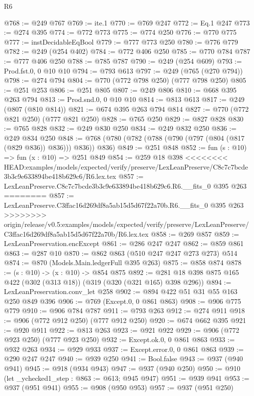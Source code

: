 \begin{lexlean}{R6}
\begin{coremodule}
{{{{{{{{{{{{{{{@768 := @249 @767
@769 := ite.{1}
@770 := @769 @247
@772 := Eq.{1} @247
@773 := @274 @395
@774 := @772 @773
@775 := @774 @250
@776 := @770 @775
@777 := instDecidableEqBool
@779 := @777 @773 @250
@780 := @776 @779
@782 := @249 (@254 @402)
@784 := @772 @406 @250
@785 := @770 @784
@787 := @777 @406 @250
@788 := @785 @787
@790 := @249 (@254 @609)
@793 := Prod.fst.{0, 0} @10 @10
@794 := @793 @613
@797 := @249 (@765 (@270 @794))
@798 := @274 @794
@804 := @770 (@772 @798 @250) (@777 @798 @250)
@805 := @251 @253
@806 := @251 @805
@807 := @249 @806
@810 := @668 @395 @263 @794
@813 := Prod.snd.{0, 0} @10 @10
@814 := @813 @613
@817 := @249 (@807 (@810 @814))
@821 := @674 @395 @263 @794 @814
@827 := @770 (@772 @821 @250) (@777 @821 @250)
@828 := @765 @250
@829 := @827 @828
@830 := @765 @828
@832 := @249 @830 @250
@834 := @249 @832 @250
@836 := @249 @834 @250
@848 := @768 (@780 (@782 (@788 (@790 (@797 (@804 (@817 (@829 @836)) @836))) @836)) @836)
@849 := @251 @848
@852 := fun (s : @10) => fun (x : @10) => @251 @849
@854 := @259 @18 @398
<<<<<<<< HEAD:examples/models/expected/verify/preserve/LexLeanPreserve/C8c7c7bcde3b3c9e633894be418b629c6/R6.lex.tex
@857 := LexLeanPreserve.C8c7c7bcde3b3c9e633894be418b629c6.R6.__fits_0 @395 @263
========
@857 := LexLeanPreserve.C3ffac16d269df8a5ab15d5d67f22a70b.R6.__fits_0 @395 @263
>>>>>>>> origin/release/v0.5:examples/models/expected/verify/preserve/LexLeanPreserve/C3ffac16d269df8a5ab15d5d67f22a70b/R6.lex.tex
@858 := @269 @857
@859 := LexLeanPreservation.encExcept
@861 := @286 @247 @247
@862 := @859 @861
@863 := @287 @10
@870 := @862 @863 (@510 @247 @247 @273 @273) @514
@874 := @870 (Models.Main.ledgerFull @395 @263)
@875 := @858 @874
@878 := (s : @10) -> (x : @10) -> @854 @875
@892 := @281 @18 @398 @875 @165 @422 (@302 (@313 @18)) (@319 (@320 (@321 @165) @398 @296))
@894 := LexLeanPreservation.conv_let @258
@902 := @894 @422 @51 @31 @55 @163 @250 @849 @396
@906 := @769 (Except.{0, 0} @861 @863)
@908 := @906 @775 @779
@910 := @906 @784 @787
@911 := @793 @263
@912 := @274 @911
@918 := @906 (@772 @912 @250) (@777 @912 @250)
@920 := @674 @662 @395
@921 := @920 @911
@922 := @813 @263
@923 := @921 @922
@929 := @906 (@772 @923 @250) (@777 @923 @250)
@932 := Except.ok.{0, 0} @861 @863
@933 := @932 @263
@934 := @929 @933
@937 := Except.error.{0, 0} @861 @863
@939 := @290 @247 @247
@940 := @939 @250
@941 := Bool.false
@943 := @937 (@940 @941)
@945 := @918 (@934 @943)
@947 := @937 (@940 @250)
@950 := @910 (let _ychecked1_step : @863 := @613; @945 @947)
@951 := @939 @941
@953 := @937 (@951 @941)
@955 := @908 (@950 @953)
@957 := @937 (@951 @250)
}}}}}}}}}}}}}}}
\end{coremodule}
\end{lexlean}
